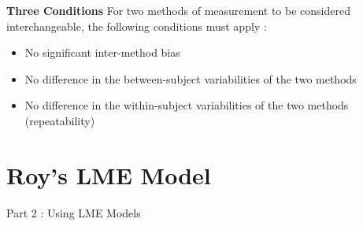 \documentclass[compress]{beamer}        %
\makeatletter
\newcommand{\tcb}{\textcolor{beamer@blendedblue}}
\makeatother
\begin{document}
		
		\begin{frame}{\bf \tcb{Three Conditions}}
			\Large
			For two methods of measurement to be considered interchangeable, the following conditions must apply \cite{Roy2009}:
			\\
			\begin{itemize}\itemsep0.5cm
				\item No significant inter-method bias
				\item No difference in the between-subject variabilities of the two methods
				\item No difference in the within-subject variabilities of the two methods (repeatability)
			\end{itemize}
		\end{frame}
	
		\section[Roy's LME Model]{Roy's LME Model}
\begin{frame}
	\huge
	Part 2 :  Using LME Models
\end{frame}	
\end{document}
